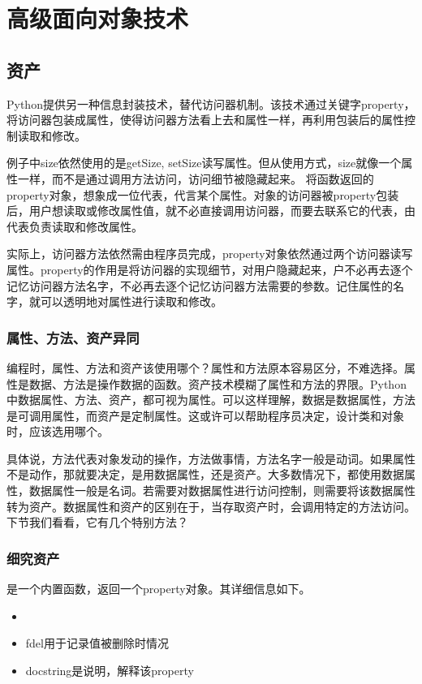 \chapter{高级面向对象技术}
\section{资产}
Python提供另一种信息封装技术，替代访问器机制。该技术通过关键字property，将访问器包装成属性，使得访问器方法看上去和属性一样，再利用包装后的属性控制读取和修改。
\begin{python}
例子中size依然使用的是getSize, setSize读写属性。但从使用方式，size就像一个属性一样，而不是通过调用方法访问，访问细节被隐藏起来。
将函数返回的property对象，想象成一位代表，代言某个属性。对象的访问器被property包装后，用户想读取或修改属性值，就不必直接调用访问器，而要去联系它的代表，由代表负责读取和修改属性。

实际上，访问器方法依然需由程序员完成，property对象依然通过两个访问器读写属性。property的作用是将访问器的实现细节，对用户隐藏起来，户不必再去逐个记忆访问器方法名字，不必再去逐个记忆访问器方法需要的参数。记住属性的名字，就可以透明地对属性进行读取和修改。

\subsection{属性、方法、资产异同}
编程时，属性、方法和资产该使用哪个？属性和方法原本容易区分，不难选择。属性是数据、方法是操作数据的函数。资产技术模糊了属性和方法的界限。Python中数据属性、方法、资产，都可视为属性。可以这样理解，数据是数据属性，方法是可调用属性，而资产是定制属性。这或许可以帮助程序员决定，设计类和对象时，应该选用哪个。

具体说，方法代表对象发动的操作，方法做事情，方法名字一般是动词。如果属性不是动作，那就要决定，是用数据属性，还是资产。大多数情况下，都使用数据属性，数据属性一般是名词。若需要对数据属性进行访问控制，则需要将该数据属性转为资产。数据属性和资产的区别在于，当存取资产时，会调用特定的方法访问。下节我们看看，它有几个特别方法？
\subsection{细究资产}
是一个内置函数，返回一个property对象。其详细信息如下。
\begin{itemize}
\item {}
\item fdel用于记录值被删除时情况
\item docstring是说明，解释该property
\end{itemize}


\end{python}
